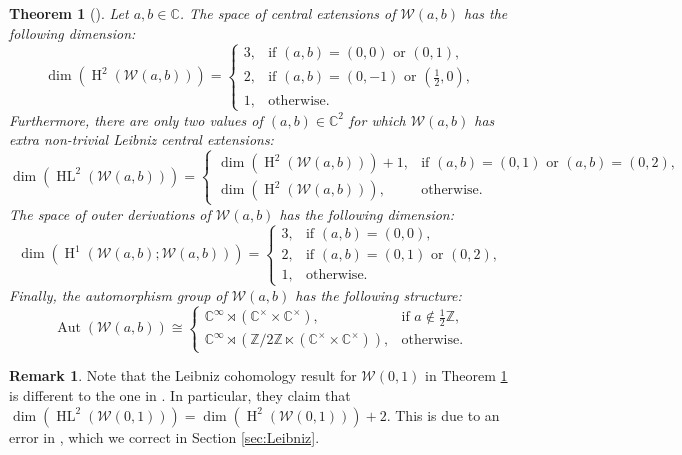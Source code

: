 \documentclass[11pt, svgnames]{amsart}
\newcommand{\ZZ}{\mathbb{Z}}
\newcommand{\CC}{\mathbb{C}}
\newcommand{\W}{\mathcal{W}}
\DeclareMathOperator{\Aut}{Aut}
\DeclareMathOperator{\HH}{H}
\DeclareMathOperator{\HL}{HL}
\newtheorem{theorem}[proposition]{Theorem}
\theoremstyle{definition}
\newtheorem{remark}[proposition]{Remark}
\begin{document}
\begin{theorem}[{\cite[Theorems 2.3, 3.5, 4.7, and 5.2]{GaoJiangPei}}]\label{thm:GJP}
    Let $a,b \in \CC$. The space of central extensions of $\W(a,b)$ has the following dimension:
    $$\dim(\HH^2(\W(a,b))) = \begin{cases}
        3, &\text{if } (a,b) = (0,0) \text{ or } (0,1), \\
        2, &\text{if } (a,b) = (0,-1) \text{ or } (\frac{1}{2},0), \\
        1, &\text{otherwise}.
    \end{cases}$$
    Furthermore, there are only two values of $(a,b) \in \CC^2$ for which $\W(a,b)$ has extra non-trivial Leibniz central extensions:
    $$\dim(\HL^2(\W(a,b))) = \begin{cases}
        \dim(\HH^2(\W(a,b))) + 1, &\text{if } (a,b) = (0,1) \text{ or } (a,b) = (0,2), \\
        \dim(\HH^2(\W(a,b))), &\text{otherwise}.
    \end{cases}$$
    The space of outer derivations of $\W(a,b)$ has the following dimension:
    $$\dim(\HH^1(\W(a,b);\W(a,b))) = \begin{cases}
        3, &\text{if } (a,b) = (0,0), \\
        2, &\text{if } (a,b) = (0,1) \text{ or } (0,2), \\
        1, &\text{otherwise}.
    \end{cases}$$
    Finally, the automorphism group of $\W(a,b)$ has the following structure:
    $$\Aut(\W(a,b)) \cong \begin{cases}
        \CC^\infty \rtimes (\CC^\times \times \CC^\times), &\text{if } a \notin \frac{1}{2}\ZZ, \\
        \CC^\infty \rtimes (\ZZ/2\ZZ \ltimes (\CC^\times \times \CC^\times)), &\text{otherwise}.
    \end{cases}$$
\end{theorem}

\begin{remark}\label{rem:error}
    Note that the Leibniz cohomology result for $\W(0,1)$ in Theorem \ref{thm:GJP} is different to the one in \cite[Theorem 3.5]{GaoJiangPei}. In particular, they claim that $\dim(\HL^2(\W(0,1))) = \dim(\HH^2(\W(0,1))) + 2$. This is due to an error in \cite[Lemma 3.2]{GaoJiangPei}, which we correct in Section \ref{sec:Leibniz}.
\end{remark}
\end{document}
